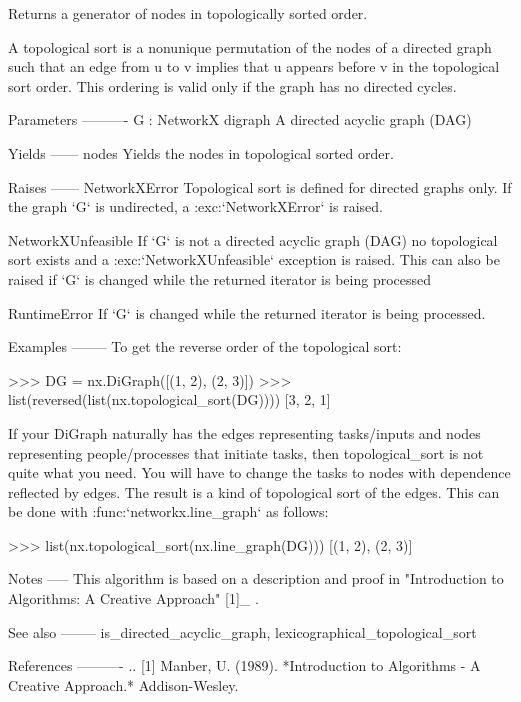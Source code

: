 \begin{DoxyVerb}Returns a generator of nodes in topologically sorted order.

A topological sort is a nonunique permutation of the nodes of a
directed graph such that an edge from u to v implies that u
appears before v in the topological sort order. This ordering is
valid only if the graph has no directed cycles.

Parameters
----------
G : NetworkX digraph
    A directed acyclic graph (DAG)

Yields
------
nodes
    Yields the nodes in topological sorted order.

Raises
------
NetworkXError
    Topological sort is defined for directed graphs only. If the graph `G`
    is undirected, a :exc:`NetworkXError` is raised.

NetworkXUnfeasible
    If `G` is not a directed acyclic graph (DAG) no topological sort exists
    and a :exc:`NetworkXUnfeasible` exception is raised.  This can also be
    raised if `G` is changed while the returned iterator is being processed

RuntimeError
    If `G` is changed while the returned iterator is being processed.

Examples
--------
To get the reverse order of the topological sort:

>>> DG = nx.DiGraph([(1, 2), (2, 3)])
>>> list(reversed(list(nx.topological_sort(DG))))
[3, 2, 1]

If your DiGraph naturally has the edges representing tasks/inputs
and nodes representing people/processes that initiate tasks, then
topological_sort is not quite what you need. You will have to change
the tasks to nodes with dependence reflected by edges. The result is
a kind of topological sort of the edges. This can be done
with :func:`networkx.line_graph` as follows:

>>> list(nx.topological_sort(nx.line_graph(DG)))
[(1, 2), (2, 3)]

Notes
-----
This algorithm is based on a description and proof in
"Introduction to Algorithms: A Creative Approach" [1]_ .

See also
--------
is_directed_acyclic_graph, lexicographical_topological_sort

References
----------
.. [1] Manber, U. (1989).
   *Introduction to Algorithms - A Creative Approach.* Addison-Wesley.
\end{DoxyVerb}
 \mbox{\label{namespacenetworkx_1_1algorithms_1_1dag_a004f6e48d82f3d56b5e5c906da0986d9}} 
